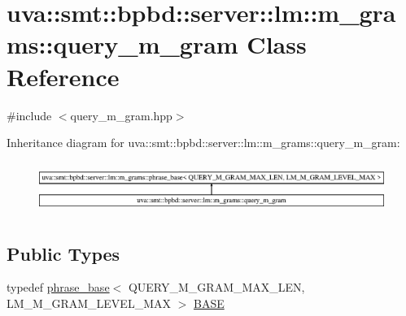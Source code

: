\hypertarget{classuva_1_1smt_1_1bpbd_1_1server_1_1lm_1_1m__grams_1_1query__m__gram}{}\section{uva\+:\+:smt\+:\+:bpbd\+:\+:server\+:\+:lm\+:\+:m\+\_\+grams\+:\+:query\+\_\+m\+\_\+gram Class Reference}
\label{classuva_1_1smt_1_1bpbd_1_1server_1_1lm_1_1m__grams_1_1query__m__gram}


{\ttfamily \#include $<$query\+\_\+m\+\_\+gram.\+hpp$>$}

Inheritance diagram for uva\+:\+:smt\+:\+:bpbd\+:\+:server\+:\+:lm\+:\+:m\+\_\+grams\+:\+:query\+\_\+m\+\_\+gram\+:\begin{figure}[H]
\begin{center}
\leavevmode
\includegraphics[height=1.691843cm]{classuva_1_1smt_1_1bpbd_1_1server_1_1lm_1_1m__grams_1_1query__m__gram}
\end{center}
\end{figure}
\subsection*{Public Types}
\begin{DoxyCompactItemize}
\item 
typedef \hyperlink{classuva_1_1smt_1_1bpbd_1_1server_1_1lm_1_1m__grams_1_1phrase__base}{phrase\+\_\+base}$<$ Q\+U\+E\+R\+Y\+\_\+\+M\+\_\+\+G\+R\+A\+M\+\_\+\+M\+A\+X\+\_\+\+L\+E\+N, L\+M\+\_\+\+M\+\_\+\+G\+R\+A\+M\+\_\+\+L\+E\+V\+E\+L\+\_\+\+M\+A\+X $>$ \hyperlink{classuva_1_1smt_1_1bpbd_1_1server_1_1lm_1_1m__grams_1_1query__m__gram_a544caeb2498e5778a14d53ccdc7f5003}{B\+A\+S\+E}
\end{DoxyCompactItemize}

